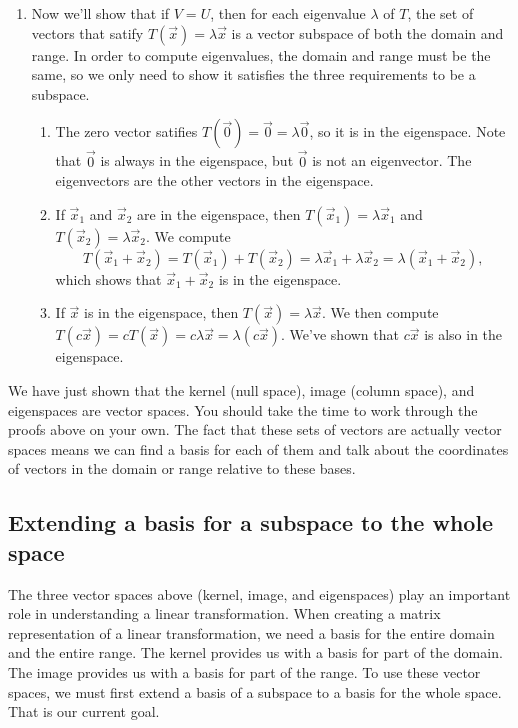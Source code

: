 \begin{example}
\begin{enumerate}
	\item Now we'll show that if $V=U$, then for each eigenvalue $\lambda$ of $T$, the set of vectors that satify $T(\vec x) = \lambda \vec x$ is a vector subspace of both the domain and range.  In order to compute eigenvalues, the domain and range must be the same, so we only need to show it satisfies the three requirements to be a subspace.
\begin{enumerate}
	\item The zero vector satifies $T(\vec 0) = \vec 0 = \lambda \vec 0$, so it is in the eigenspace.  Note that $\vec 0$ is always in the eigenspace, but $\vec 0$ is not an eigenvector. The eigenvectors are the other vectors in the eigenspace.
	\item If $\vec x_1$ and $\vec x_2$ are in the eigenspace, then $T(\vec x_1)=\lambda \vec x_1$ and $T(\vec x_2)=\lambda \vec x_2$. We compute $$T(\vec x_1+\vec x_2)=T(\vec x_1)+T(\vec x_2)=\lambda \vec x_1+\lambda \vec x_2 = \lambda (\vec x_1+\vec x_2),$$ which shows that $\vec x_1+\vec x_2$ is in the eigenspace.
	\item If $\vec x$ is in the eigenspace, then $T(\vec x)=\lambda \vec x$. We then compute $T(c\vec x)=cT(\vec x)=c\lambda \vec x= \lambda (c\vec x)$. We've shown that $c\vec x$ is also in the eigenspace.
\end{enumerate}
\end{enumerate}
\end{example}

We have just shown that the kernel (null space), image (column space), and eigenspaces are vector spaces. You should take the time to work through the proofs above on your own. The fact that these sets of vectors are actually vector spaces means we can find a basis for each of them and talk about the coordinates of vectors in the domain or range relative to these bases.




\subsection{Extending a basis for a subspace to the whole space}
The three vector spaces above (kernel, image, and eigenspaces) play an important role in understanding a linear transformation. When creating a matrix representation of a linear transformation, we need a basis for the entire domain and the entire range.  The kernel provides us with a basis for part of the domain. The image provides us with a basis for part of the range.  To use these vector spaces, we must first extend a basis of a subspace to a basis for the whole space.  That is our current goal.


